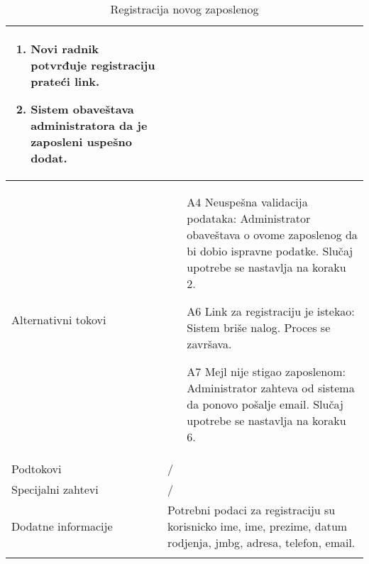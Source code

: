 \documentclass[../main.tex]{subfiles}
\begin{document}
\begin{longtable}{| p{} | p{} |}
\begin{enumerate}
        \item Novi radnik potvrđuje registraciju prateći link.
        \item Sistem obaveštava administratora da je zaposleni uspešno dodat.
    \end{enumerate}\\
\hline
    Alternativni tokovi & \begin{itemize}
        \item[A4] Neuspešna validacija podataka: Administrator obaveštava o ovome zaposlenog da bi dobio ispravne podatke. Slučaj upotrebe se nastavlja na koraku 2.
        \item[A6] Link za registraciju je istekao: Sistem briše nalog. Proces se završava.
        \item[A7] Mejl nije stigao zaposlenom: Administrator zahteva od sistema da ponovo pošalje email. Slučaj upotrebe se nastavlja na koraku 6.

    \end{itemize}\\
\hline
    Podtokovi & /\\
\hline
    Specijalni zahtevi & /\\
\hline
    Dodatne informacije & Potrebni podaci za registraciju su korisnicko ime, ime, prezime, datum rodjenja, jmbg, adresa, telefon, email.\\
\hline
\caption{Registracija novog zaposlenog} %
\end{longtable}
\end{document}
